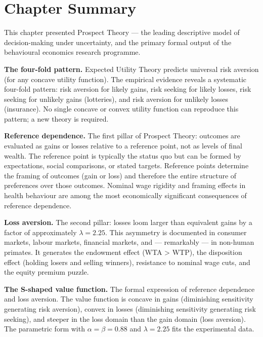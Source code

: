 \documentclass[12pt, letterpaper]{article}
\begin{document}
\medskip


\section*{Chapter Summary}


This chapter presented Prospect Theory --- the leading descriptive model of decision-making under uncertainty, and the primary formal output of the behavioural economics research programme.

\textbf{The four-fold pattern.} Expected Utility Theory predicts universal risk aversion (for any concave utility function). The empirical evidence reveals a systematic four-fold pattern: risk aversion for likely gains, risk seeking for likely losses, risk seeking for unlikely gains (lotteries), and risk aversion for unlikely losses (insurance). No single concave or convex utility function can reproduce this pattern; a new theory is required.

\textbf{Reference dependence.} The first pillar of Prospect Theory: outcomes are evaluated as gains or losses relative to a reference point, not as levels of final wealth. The reference point is typically the status quo but can be formed by expectations, social comparisons, or stated targets. Reference points determine the framing of outcomes (gain or loss) and therefore the entire structure of preferences over those outcomes. Nominal wage rigidity and framing effects in health behaviour are among the most economically significant consequences of reference dependence.

\textbf{Loss aversion.} The second pillar: losses loom larger than equivalent gains by a factor of approximately $\lambda = 2.25$. This asymmetry is documented in consumer markets, labour markets, financial markets, and --- remarkably --- in non-human primates. It generates the endowment effect (WTA > WTP), the disposition effect (holding losers and selling winners), resistance to nominal wage cuts, and the equity premium puzzle.

\textbf{The S-shaped value function.} The formal expression of reference dependence and loss aversion. The value function is concave in gains (diminishing sensitivity generating risk aversion), convex in losses (diminishing sensitivity generating risk seeking), and steeper in the loss domain than the gain domain (loss aversion). The parametric form with $\alpha = \beta = 0.88$ and $\lambda = 2.25$ fits the experimental data.
\end{document}
